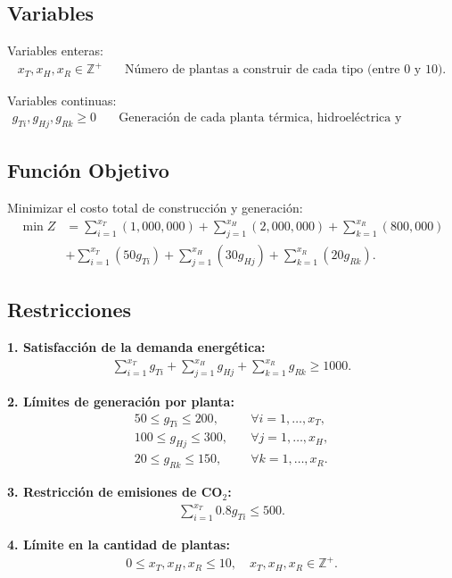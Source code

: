 \documentclass{article}
\begin{document}
\subsection{Variables}

Variables enteras:
\begin{align*}
    x_T, x_H, x_R \in \mathbb{Z}^+ \quad &\text{Número de plantas a construir de cada tipo (entre 0 y 10).}
\end{align*}

Variables continuas:
\begin{align*}
    g_{Ti}, g_{Hj}, g_{Rk} \geq 0 \quad &\text{Generación de cada planta térmica, hidroeléctrica y renovable.}
\end{align*}

\subsection{Función Objetivo}

Minimizar el costo total de construcción y generación:
\begin{align*}
    \min Z &= \sum_{i=1}^{x_T} (1,000,000) + \sum_{j=1}^{x_H} (2,000,000) + \sum_{k=1}^{x_R} (800,000) \\
    &+ \sum_{i=1}^{x_T} (50 g_{Ti}) + \sum_{j=1}^{x_H} (30 g_{Hj}) + \sum_{k=1}^{x_R} (20 g_{Rk}).
\end{align*}

\subsection{Restricciones}

\textbf{1. Satisfacción de la demanda energética:}
\begin{align*}
    \sum_{i=1}^{x_T} g_{Ti} + \sum_{j=1}^{x_H} g_{Hj} + \sum_{k=1}^{x_R} g_{Rk} \geq 1000.
\end{align*}

\textbf{2. Límites de generación por planta:}
\begin{align*}
    50 \leq g_{Ti} \leq 200, \quad &\forall i = 1, \dots, x_T, \\
    100 \leq g_{Hj} \leq 300, \quad &\forall j = 1, \dots, x_H, \\
    20 \leq g_{Rk} \leq 150, \quad &\forall k = 1, \dots, x_R.
\end{align*}

\textbf{3. Restricción de emisiones de CO$_2$:}
\begin{align*}
    \sum_{i=1}^{x_T} 0.8 g_{Ti} \leq 500.
\end{align*}

\textbf{4. Límite en la cantidad de plantas:}
\begin{align*}
    0 \leq x_T, x_H, x_R \leq 10, \quad x_T, x_H, x_R \in \mathbb{Z}^+.
\end{align*}
\end{document}
